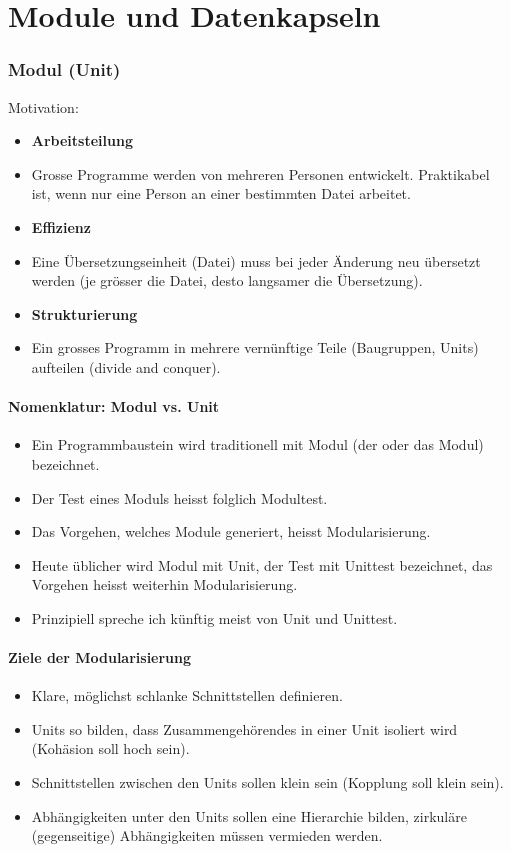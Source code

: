 
\part{Module und Datenkapseln}

\section{Modul (Unit)}
Motivation:
\begin{itemize}
	\item \textbf{Arbeitsteilung}
	\item[\-] Grosse Programme werden von mehreren Personen entwickelt. Praktikabel ist, wenn nur eine Person an einer bestimmten Datei arbeitet.
	\item \textbf{Effizienz}
	\item[\-] Eine Übersetzungseinheit (Datei) muss bei jeder Änderung neu übersetzt werden (je grösser die Datei, desto langsamer die Übersetzung).
	\item \textbf{Strukturierung}
	\item[\-] Ein grosses  Programm in mehrere vernünftige Teile (Baugruppen, Units) aufteilen (divide and conquer).
\end{itemize}

\subsection{Nomenklatur: Modul vs. Unit}
\begin{itemize}
	\item Ein Programmbaustein wird traditionell mit Modul (der oder das Modul) bezeichnet.
	\item Der Test eines Moduls heisst folglich Modultest.
	\item Das Vorgehen, welches Module generiert, heisst Modularisierung.
	\item Heute üblicher wird Modul mit Unit, der Test mit Unittest bezeichnet, das Vorgehen heisst weiterhin Modularisierung.
	\item Prinzipiell spreche ich künftig meist von Unit und Unittest.
\end{itemize}

\subsection{Ziele der Modularisierung}
\begin{itemize}
	\item Klare, möglichst schlanke Schnittstellen definieren.
	\item Units so bilden, dass Zusammengehörendes in einer Unit isoliert wird (Kohäsion soll hoch sein).
	\item Schnittstellen zwischen den Units sollen klein sein (Kopplung soll klein sein).
	\item Abhängigkeiten unter den Units sollen eine Hierarchie bilden, zirkuläre (gegenseitige) Abhängigkeiten müssen vermieden werden.
\end{itemize}

